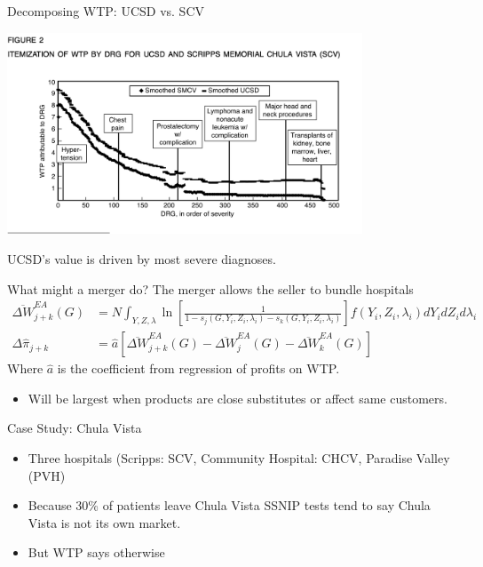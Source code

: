 \documentclass[xcolor=pdftex,dvipsnames,table,mathserif,aspectratio=169]{beamer}
\begin{document}
\begin{frame}{Decomposing WTP: UCSD vs. SCV}
\begin{center}
\includegraphics[height=6cm]{./resources/cds_fig2}
\end{center}
UCSD's value is driven by most severe diagnoses.
\end{frame}


\begin{frame}{What might a merger do?}
The merger allows the seller to \alert{bundle} hospitals
\begin{align*}
\overline{\Delta W}_{j+k}^{E A}(G)&=N \int_{Y, Z, \lambda} \ln \left[\frac{1}{1-s_{j}\left(G, Y_{i}, Z_{i}, \lambda_{i}\right)-s_{k}\left(G, Y_{i}, Z_{i}, \lambda_{i}\right)}\right] f\left(Y_{i}, Z_{i}, \lambda_{i}\right) d Y_{i} d Z_{i} d \lambda_{i}\\
\Delta \hat{\pi}_{j+k}&=\hat{a}\left[\overline{\Delta W}_{j+k}^{E A}(G)-\overline{\Delta W}_{j}^{E A}(G)-\overline{\Delta W}_{k}^{E A}(G)\right]
\end{align*}
Where $\hat{a}$ is the coefficient from regression of profits on WTP.
\begin{itemize}
\item Will be largest when products are close substitutes or affect same customers.
\end{itemize}

\end{frame}

\begin{frame}{Case Study: Chula Vista}
\begin{itemize}
\item Three hospitals (Scripps: SCV, Community Hospital: CHCV, Paradise Valley (PVH)
\item Because 30\% of patients leave Chula Vista SSNIP tests tend to say Chula Vista is not its own market.
\item But WTP says otherwise
\end{itemize}
\end{frame}
\end{document}
